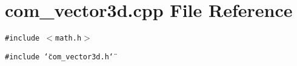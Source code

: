 \section{com\_\-vector3d.cpp File Reference}
\label{com__vector3d_8cpp}
{\tt \#include $<$math.h$>$}\par
{\tt \#include \char`\"{}com\_\-vector3d.h\char`\"{}}\par
